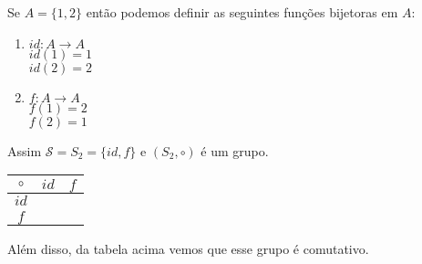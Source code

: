 \documentclass{beamer}
\begin{document}
    \begin{frame}
        Se $A = \{1, 2\}$ ent\~ao podemos definir as seguintes fun\c{c}\~oes bijetoras em $A$:
        \begin{multicols}{2}
            \begin{enumerate}
                \item[] \begin{center}
                    $id : A \to A$\\
                    $id(1) = 1$\\ $id(2) = 2$
                \end{center}\pause
                \item[]  \begin{center}
                    $f : A \to A$\\ $f(1) = 2$\\ $f(2) = 1$
                \end{center}\pause
            \end{enumerate}
        \end{multicols}

        Assim $\mathcal{S} = S_2 = \{id, f\}$ e $(S_2, \circ)$ \'e um grupo.\pause

        \begin{table}[!htb]
        \centering
            \begin{tabular}{|c|c|c|} 
                \hline
                $\circ$ & $id$ & $f$\T\\
                \hline
                $id$ & \phantom{xyz} & \phantom{xyz}\T\\
                \hline
                $f$ & \phantom{xyz} & \phantom{xyz}\T\\
                \hline
            \end{tabular}
        \end{table}\pause

        Al\'em disso, da tabela acima vemos que esse grupo \'e comutativo.
    \end{frame}
\end{document}
